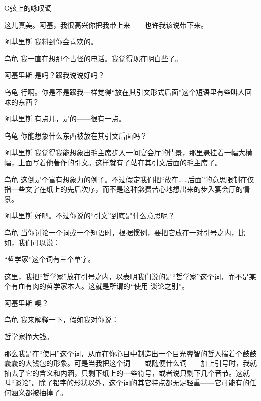 \begin{dialog}{G弦上的咏叹调}
\begin{dialogue}

这儿真美。阿基，我很高兴你把我带上来——也许我该说带下来。

\item[阿基里斯]我料到你会喜欢的。

\item[乌龟]我一直在想那个古怪的电话。我觉得现在明白些了。

\item[阿基里斯]是吗？跟我说说好吗？

\item[乌龟]行啊。你是不是跟我一样觉得“放在其引文形式后面”这个短语里有些叫人回味的东西？

\item[阿基里斯]有点儿，是的——很有一点。

\item[乌龟]你能想象什么东西被放在其引文后面吗？

\item[阿基里斯]我觉得我能想象出毛主席步入一间宴会厅的情景，那里悬挂着一幅大横幅，上面写着他著作的引文。这样就有了站在其引文后面的毛主席了。

\item[乌龟]这倒是个富有想象力的例子。不过假定我们把“放在……后面”的意思限制在仅指一些文字在纸上的先后次序，而不是这种煞费苦心地想出来的步入宴会厅的情景。

\item[阿基里斯]好吧。不过你说的“引文”到底是什么意思呢？

\item[乌龟]当你讨论一个词或一个短语时，根据惯例，要把它放在一对引号之内，比如，我们可以说：
\begin{block}
“哲学家”这个词有三个单字。
\end{block}
这里，我把“哲学家”放在引号之内，以表明我们说的是“哲学家”这个词，而不是某个有血有肉的哲学家本人。这就是所谓的“使用-谈论之别”。

\item[阿基里斯]噢？

\item[乌龟]我来解释一下，假如我对你说：
\begin{block}
哲学家挣大钱。
\end{block}
那么我是在“使用”这个词，从而在你心目中制造出一个目光睿智的哲人揣着个鼓鼓囊囊的大钱包的形象。可是当我把这个词——或随便什么词——加上引号时，我就抽去了它的含义和内涵，只剩下纸上的一些符号，或者说只剩下几个音节。这就叫“谈论”。除了铅字的形状以外，这个词的其它特点都无足轻重——它可能有的任何涵义都被抽掉了。


\end{dialogue}
\end{dialog}
